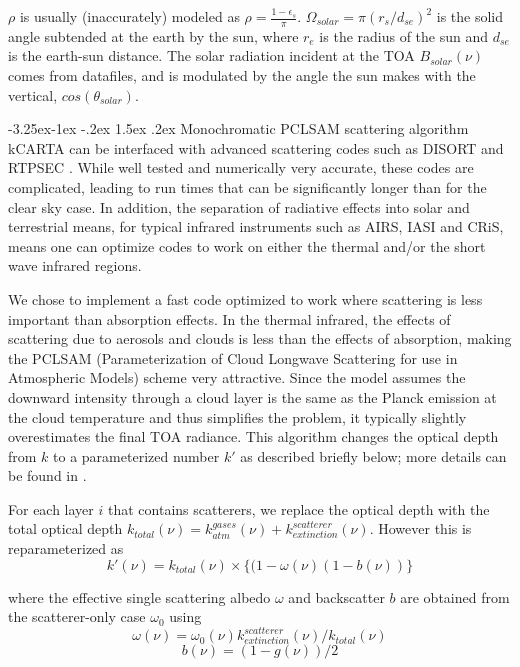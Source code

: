 \documentclass[11pt]{article}
\makeatletter
\newcommand{\kc}{\textsf{kCARTA}\xspace}
\renewcommand{\subsection}{\@startsection{subsection}{2}{\z@}%
                                     {-3.25ex\@plus -1ex \@minus -.2ex}%
                                     {1.5ex \@plus .2ex}%
                                     {\reset@font\normalsize\bfseries}}
\makeatother
\begin{document}
$\rho$ is usually (inaccurately) modeled as
$\rho = \frac{1 - \epsilon_{s}}{\pi}$.
$\Omega_{solar} = \pi(r_{s}/d_{se})^{2}$ is the solid angle subtended at the
earth by the sun, where $r_{e}$ is the radius of the sun and $d_{se}$ is the
earth-sun distance. The solar radiation incident at the TOA $B_{solar}(\nu)$
comes from datafiles, and is modulated by the angle the sun makes with the
vertical, $cos(\theta_{solar})$.

\subsection{\textsf{Monochromatic PCLSAM} scattering algorithm}
\kc can be interfaced with advanced scattering codes such as DISORT \cite{stam:88}
and RTPSEC \cite{dee:98}. While well tested and numerically very accurate, these codes are
complicated, leading to run times that can be significantly longer than for the clear sky case.
In addition, the separation of radiative effects into solar and terrestrial means, 
for typical infrared instruments such as AIRS, IASI and CRiS, means one can optimize 
codes to work on either the thermal and/or the short wave infrared regions. 

We chose to implement a fast code optimized to work where scattering is
less important than absorption effects. In the thermal infrared, the effects of
scattering due to aerosols and clouds is less than the effects of absorption, making
the \textsf{PCLSAM} (Parameterization of Cloud Longwave Scattering for use in
Atmospheric Models) scheme \cite{cho:99} very attractive. Since the model assumes 
the downward intensity through a cloud layer is the same as the Planck emission at the
cloud temperature and thus simplifies the problem, it typically slightly
overestimates the final TOA radiance. This algorithm changes the optical
depth from $k$ to a parameterized number $k\prime$ as described briefly
below; more details can be found in \cite{cho:99,mat:05}.

For each layer $i$ that contains scatterers, we replace the optical depth with
the total optical depth
   $k_{total}(\nu) = k_{atm}^{gases}(\nu) + k^{scatterer}_{extinction}(\nu)$.
However this is reparameterized as
\[
k\prime(\nu) = k_{total}(\nu) \times \{ (1-\omega(\nu) (1-b(\nu)) \}
\]

where the effective single scattering albedo $\omega$ and backscatter $b$ are
obtained from the scatterer-only case $\omega_{0}$ using
\[
\omega(\nu) = \omega_{0}(\nu) k^{scatterer}_{extinction}(\nu)/k_{total}(\nu)
\]
\[
b(\nu)      = (1 - g(\nu))/2
\]
\end{document}
